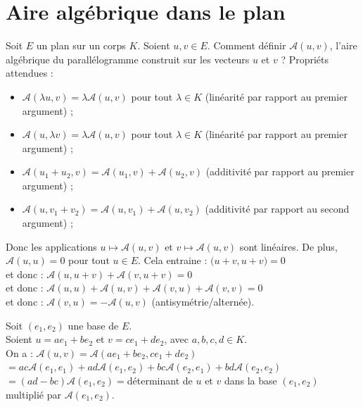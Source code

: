 \documentclass{article}
\begin{document}

\section{Aire algébrique dans le plan}

Soit $E$ un plan sur un corps $K$.
Soient $u,v \in E$.
Comment définir $\mathcal{A}(u,v)$, l'aire algébrique du parallélogramme construit sur les vecteurs $u$ et $v$ ?
Propriéts attendues :
\begin{itemize}
    \item $\mathcal{A}(\lambda u,v) = \lambda \mathcal{A}(u,v)$ pour tout $\lambda \in K$ (linéarité par rapport au premier argument) ;
    \item $\mathcal{A}(u,\lambda v) = \lambda \mathcal{A}(u,v)$ pour tout $\lambda \in K$ (linéarité par rapport au premier argument) ;
    \item $\mathcal{A}(u_1+u_2, v) = \mathcal{A}(u_1,v) + \mathcal{A}(u_2,v)$ (additivité par rapport au premier argument) ;
    \item $\mathcal{A}(u,v_1+v_2) = \mathcal{A}(u,v_1) + \mathcal{A}(u,v_2)$ (additivité par rapport au second argument) ;
\end{itemize}
Donc les applications $u \mapsto \mathcal{A}(u,v)$ et $v \mapsto \mathcal{A}(u,v)$ sont linéaires.
De plus, $\mathcal{A}(u,u) = 0$ pour tout $u \in E$.
Cela entraine : $\mathcal(u+v, u+v) = 0$\\
et donc : $\mathcal{A}(u,u+v) + \mathcal{A}(v,u+v) = 0$\\
et donc : $\mathcal{A}(u,u) + \mathcal{A}(u,v) + \mathcal{A}(v,u) + \mathcal{A}(v,v) = 0$\\
et donc : $\mathcal{A}(v,u) = -\mathcal{A}(u,v)$ (antisymétrie/alternée).

Soit $(e_1,e_2)$ une base de $E$.\\
Soient $u=ae_1 + be_2$ et $v=ce_1 + de_2$, avec $a,b,c,d \in K$.\\
On a : $\mathcal{A}(u,v) = \mathcal{A}(ae_1 + be_2, ce_1 + de_2)$\\
$= ac\mathcal{A}(e_1,e_1) + ad\mathcal{A}(e_1,e_2) + bc\mathcal{A}(e_2,e_1) + bd\mathcal{A}(e_2,e_2)$\\
$= (ad - bc)\mathcal{A}(e_1,e_2) = $déterminant de $u$ et $v$ dans la base $(e_1,e_2)$ multiplié par $\mathcal{A}(e_1,e_2)$.

\end{document}
